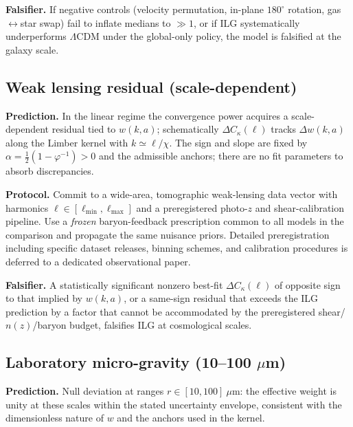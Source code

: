 \documentclass[11pt]{article}
\begin{document}
\textbf{Falsifier.} If negative controls (velocity permutation, in-plane \(180^\circ\) rotation, gas\(\leftrightarrow\)star swap) fail to inflate medians to \(\gg 1\), or if ILG systematically underperforms \(\Lambda\)CDM under the global-only policy, the model is falsified at the galaxy scale.

\subsection{Weak lensing residual (scale-dependent)}\label{subsec:pred-lensing}
\textbf{Prediction.} In the linear regime the convergence power acquires a scale-dependent residual tied to \(w(k,a)\); schematically \(\Delta C_\kappa(\ell)\) tracks \(\Delta w(k,a)\) along the Limber kernel with \(k\!\simeq\!\ell/\chi\). The sign and slope are fixed by \(\alpha=\tfrac12(1-\varphi^{-1})>0\) and the admissible anchors; there are no fit parameters to absorb discrepancies.

\textbf{Protocol.} Commit to a wide-area, tomographic weak-lensing data vector with harmonics \(\ell\in[\ell_{\min},\ell_{\max}]\) and a preregistered photo-\(z\) and shear-calibration pipeline. Use a \emph{frozen} baryon-feedback prescription common to all models in the comparison and propagate the same nuisance priors. Detailed preregistration including specific dataset releases, binning schemes, and calibration procedures is deferred to a dedicated observational paper.

\textbf{Falsifier.} A statistically significant nonzero best-fit \(\Delta C_\kappa(\ell)\) of opposite sign to that implied by \(w(k,a)\), or a same-sign residual that exceeds the ILG prediction by a factor that cannot be accommodated by the preregistered shear/\(n(z)\)/baryon budget, falsifies ILG at cosmological scales.

\subsection{Laboratory micro-gravity (10--100 \texorpdfstring{$\mu$m}{micron})}\label{subsec:pred-micro}
\textbf{Prediction.} Null deviation at ranges \(r\in[10,100]~\mu\mathrm{m}\): the effective weight is unity at these scales within the stated uncertainty envelope, consistent with the dimensionless nature of \(w\) and the anchors used in the kernel.%
\end{document}
